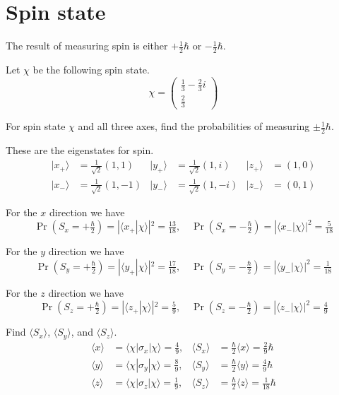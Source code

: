 

\section*{Spin state}

The result of measuring spin is either $+\tfrac{1}{2}\hbar$ or $-\tfrac{1}{2}\hbar$.

\bigskip
Let $\chi$ be the following spin state.
\begin{equation*}
\chi=\begin{pmatrix}\frac{1}{3}-\frac{2}{3}i\\[1ex]\frac{2}{3}\end{pmatrix}
\end{equation*}

For spin state $\chi$ and all three axes, find the probabilities of measuring $\pm\tfrac{1}{2}\hbar$.

\bigskip
These are the eigenstates for spin.
\begin{align*}
|x_+\rangle&=\tfrac{1}{\sqrt2}(1,1) &
|y_+\rangle&=\tfrac{1}{\sqrt2}(1,i) &
|z_+\rangle&=(1,0)
\\
|x_-\rangle&=\tfrac{1}{\sqrt2}(1,-1) &
|y_-\rangle&=\tfrac{1}{\sqrt2}(1,-i) &
|z_-\rangle&=(0,1)
\end{align*}

For the $x$ direction we have
\begin{equation*}
\Pr\left(S_x=+\tfrac{\hbar}{2}\right)=|\langle x_+|\chi\rangle|^2=\tfrac{13}{18},\quad
\Pr\left(S_x=-\tfrac{\hbar}{2}\right)=|\langle x_-|\chi\rangle|^2=\tfrac{5}{18}
\end{equation*}

For the $y$ direction we have
\begin{equation*}
\Pr\left(S_y=+\tfrac{\hbar}{2}\right)=|\langle y_+|\chi\rangle|^2=\tfrac{17}{18},\quad
\Pr\left(S_y=-\tfrac{\hbar}{2}\right)=|\langle y_-|\chi\rangle|^2=\tfrac{1}{18}
\end{equation*}

For the $z$ direction we have
\begin{equation*}
\Pr\left(S_z=+\tfrac{\hbar}{2}\right)=|\langle z_+|\chi\rangle|^2=\tfrac{5}{9},\quad
\Pr\left(S_z=-\tfrac{\hbar}{2}\right)=|\langle z_-|\chi\rangle|^2=\tfrac{4}{9}
\end{equation*}

Find $\langle S_x\rangle$, $\langle S_y\rangle$, and $\langle S_z\rangle$.
\begin{align*}
\langle x\rangle&=\langle\chi|\sigma_x|\chi\rangle=\tfrac{4}{9}, &
\langle S_x\rangle&=\tfrac{\hbar}{2}\langle x\rangle=\tfrac{2}{9}\hbar
\\[1ex]
\langle y\rangle&=\langle\chi|\sigma_y|\chi\rangle=\tfrac{8}{9}, &
\langle S_y\rangle&=\tfrac{\hbar}{2}\langle y\rangle=\tfrac{4}{9}\hbar
\\[1ex]
\langle z\rangle&=\langle\chi|\sigma_z|\chi\rangle=\tfrac{1}{9}, &
\langle S_z\rangle&=\tfrac{\hbar}{2}\langle z\rangle=\tfrac{1}{18}\hbar
\end{align*}


